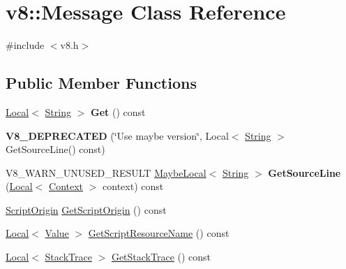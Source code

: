 \hypertarget{classv8_1_1Message}{}\section{v8\+:\+:Message Class Reference}
\label{classv8_1_1Message}


{\ttfamily \#include $<$v8.\+h$>$}

\subsection*{Public Member Functions}
\begin{DoxyCompactItemize}
\item 
\mbox{\label{classv8_1_1Message_a75be72a4c94c3c1bf1c6ea8ffc47c992}} 
\mbox{\hyperlink{classv8_1_1Local}{Local}}$<$ \mbox{\hyperlink{classv8_1_1String}{String}} $>$ {\bfseries Get} () const
\item 
\mbox{\label{classv8_1_1Message_ab667582044385d73b2d2b2f53e7361b5}} 
{\bfseries V8\+\_\+\+D\+E\+P\+R\+E\+C\+A\+T\+ED} (\char`\"{}Use maybe version\char`\"{}, Local$<$ \mbox{\hyperlink{classv8_1_1String}{String}} $>$ Get\+Source\+Line() const)
\item 
\mbox{\label{classv8_1_1Message_ab0d34a29be64b00d8379e395fb193200}} 
V8\+\_\+\+W\+A\+R\+N\+\_\+\+U\+N\+U\+S\+E\+D\+\_\+\+R\+E\+S\+U\+LT \mbox{\hyperlink{classv8_1_1MaybeLocal}{Maybe\+Local}}$<$ \mbox{\hyperlink{classv8_1_1String}{String}} $>$ {\bfseries Get\+Source\+Line} (\mbox{\hyperlink{classv8_1_1Local}{Local}}$<$ \mbox{\hyperlink{classv8_1_1Context}{Context}} $>$ context) const
\item 
\mbox{\hyperlink{classv8_1_1ScriptOrigin}{Script\+Origin}} \mbox{\hyperlink{classv8_1_1Message_a3530ffb45b802c46a47349e610402a3c}{Get\+Script\+Origin}} () const
\item 
\mbox{\hyperlink{classv8_1_1Local}{Local}}$<$ \mbox{\hyperlink{classv8_1_1Value}{Value}} $>$ \mbox{\hyperlink{classv8_1_1Message_a843084f6838bd58d5fd888ab460cb2d4}{Get\+Script\+Resource\+Name}} () const
\item 
\mbox{\hyperlink{classv8_1_1Local}{Local}}$<$ \mbox{\hyperlink{classv8_1_1StackTrace}{Stack\+Trace}} $>$ \mbox{\hyperlink{classv8_1_1Message_a4b10ab26bf81c74301bcd93750fd077e}{Get\+Stack\+Trace}} () const
\item 

\end{DoxyCompactItemize}
